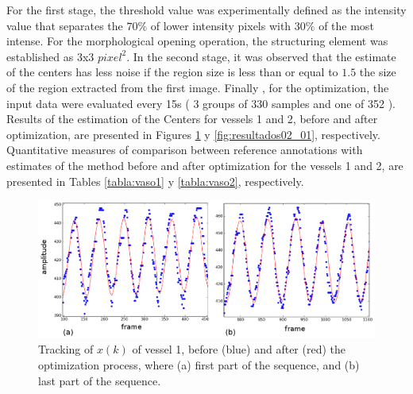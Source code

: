 \documentclass[10pt,a4paper,report]{article}
\begin{document}
For the first stage, the threshold value was experimentally defined as the intensity value that separates the $70\% $ of lower intensity pixels with $30\% $ of the most intense. For the morphological opening operation, the structuring element was established as 3x3 $pixel^2$. In the second stage, it was observed that the estimate of the centers has less noise if the region size is less than or equal to $ 1.5 $ the size of the region extracted from the first image. Finally , for the optimization, the input data were evaluated every 15s ( 3 groups of 330 samples and one of 352 ). Results of the estimation of the Centers for vessels 1 and 2, before and after optimization, are presented in Figures \ref{fig:resultados01_1} y \ref{fig:resultados02_01}, respectively. Quantitative measures of comparison between reference annotations with estimates of the method before and after optimization for the vessels 1 and 2, are presented in Tables \ref{tabla:vaso1} y \ref{tabla:vaso2}, respectively.
%
%
\begin{figure}[h!]
\centering
\includegraphics[width=1.0\textwidth]{figures/resultados01_1}
\caption{Tracking of $x(k)$ of vessel 1, before (blue) and after (red) the optimization process, where (a) first part of the sequence, and (b) last part of the sequence.}
\label{fig:resultados01_1}
\end{figure}
\end{document}
